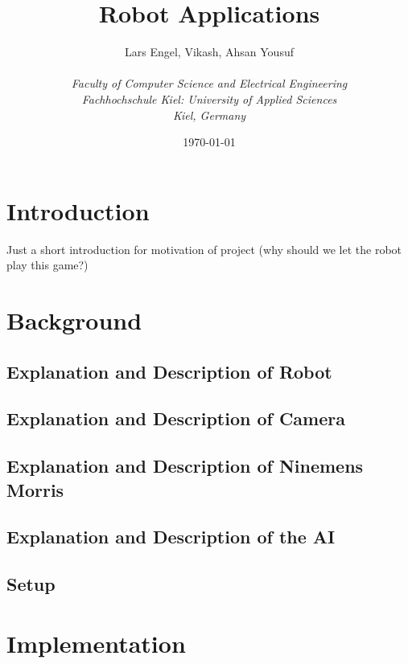 \documentclass[a4paper]{spie}  %
\title{Robot Applications}
\author{Lars Engel, Vikash, Ahsan Yousuf
\\\textit{\\Faculty of Computer Science and Electrical Engineering
\\Fachhochschule Kiel: University of Applied Sciences\\ Kiel, Germany}
}
\date{\today}
\begin{document}
 
  
  \begin{LARGE}
  \maketitle
  \end{LARGE}
  \vspace{60pt}
  \begin{large}
  \tableofcontents
  \newpage



\section{Introduction}
Just a short introduction for motivation of project (why should we let the robot play this game?)
\section{Background}
\subsection{Explanation and Description of Robot}
\subsection{Explanation and Description of Camera}
\subsection{Explanation and Description of Ninemens Morris}
\subsection{Explanation and Description of the AI}
\subsection{Setup}
\newpage
\section{Implementation}

\end{large}
\end{document}
